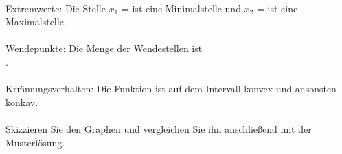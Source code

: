 \begin{MExercises}
\begin{MExercise}
\ \\
Extremwerte: Die Stelle $x_1$ =  ist eine Minimalstelle und
$x_2$ =  ist eine Maximalstelle.\\
\ \\
Wendepunkte: Die Menge der Wendestellen ist
\\.\\
\ \\
Kr\"mmungsverhalten: Die Funktion ist auf dem Intervall  konvex und ansonsten konkav.\\%
\ \\%
Skizzieren Sie den Graphen und vergleichen Sie ihn anschließend mit der Musterlösung.


\end{MExercise}
\end{MExercises}
